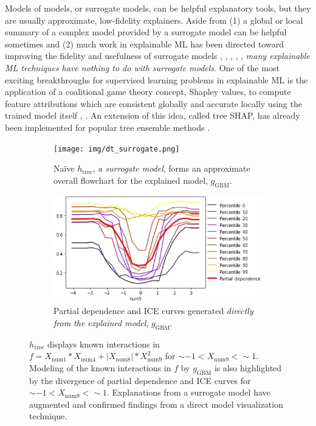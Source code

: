 \documentclass{article}
\begin{document}
Models of models, or surrogate models, can be helpful explanatory tools, but they are usually approximate, low-fidelity explainers. Aside from (1) a global or local summary of a complex model provided by a surrogate model can be helpful sometimes and (2) much work in explainable ML has been directed toward improving the fidelity and usefulness of surrogate models \cite{dt_surrogate2}, \cite{viper}, \cite{dt_surrogate1}, \cite{lime-sup}, \cite{wf_xnn}, \textit{many explainable ML techniques have nothing to do with surrogate models}. One of the most exciting breakthroughs for supervised learning problems in explainable ML is the application of a coalitional game theory concept, Shapley values, to compute feature attributions which are consistent globally and accurate locally using the trained model itself \cite{shapley}, \cite{kononenko2010efficient}. An extension of this idea, called tree SHAP, has already been implemented for popular tree ensemble methods \cite{tree_shap}.

\begin{figure}[htb!]
	\begin{subfigure}{.55\textwidth}
		\texttt{[image: img/dt\_surrogate.png]}
  		\caption{Na\"ive $h_{\text{tree}}$, \textit{a surrogate model}, forms an approximate overall flowchart for the explained model, $g_{\text{GBM}}$.}
  		\label{fig:dt_surrogate}
	\end{subfigure}\hspace{5pt}
	\begin{subfigure}{.45\textwidth}
  		\includegraphics[height=.52\linewidth, width=1.02\linewidth]{img/pdp_ice.png}
  		\caption{Partial dependence and ICE curves generated \textit{directly from the explained model}, $g_{\text{GBM}}$.}
  		\label{fig:pdp_ice}
	\end{subfigure}
	\caption{$h_{\text{tree}}$ displays known interactions in $f = X_{\text{num}1} * X_{\text{num}4} + |X_{\text{num}8}| * X_{\text{num}9}^2$ for $\sim -1 < X_{\text{num9}} <  \sim 1$. Modeling of the known interactions in $f$ by $g_{\text{GBM}}$ is also highlighted by the divergence of partial dependence and ICE curves for $\sim -1 < X_{\text{num9}} <  \sim 1$. Explanations from a surrogate model have augmented and confirmed findings from a direct model visualization technique.}
	\label{fig:pdp_ice_dt_surrogate}
\end{figure}
\end{document}

